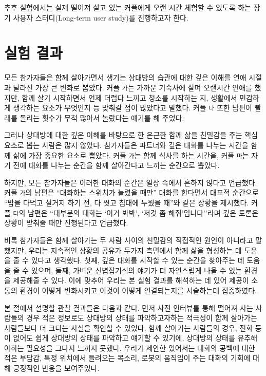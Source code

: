 추후 실험에서는 실제 떨어져 살고 있는 커플에게 \sysname\을 오랜 시간 체험할 수 있도록 하는 장기 사용자 스터디(Long-term user study)를 진행하고자 한다.


\section{실험 결과}


모든 참가자들은 함께 살아가면서 생기는 상대방의 습관에 대한 깊은 이해를 연애 시절과 달라진 가장 큰 변화로 뽑았다. 커플 \texttt{가}는 가까운 기숙사에 살며 오랜시간 연애를 했지만, 함께 살기 시작하면서 언제 더럽다 느끼고 청소를 시작하는 지, 생활에서 민감하게 생각하는 요소가 무엇인지 등 맞춰갈 점이 많았다고 말했다. 커플 \texttt{나} 또한 남편이 빨래를 돌리는 횟수가 무척 많아서 놀랐다는 얘기를 해 주었다.

그러나 상대방에 대한 깊은 이해를 바탕으로 한 은근한 함께 삶을 친밀감을 주는 핵심 요소로 뽑는 사람은 많지 않았다. 참가자들은 파트너와 깊은 대화를 나누는 시간을 함께 삶에 가장 중요한 요소로 뽑았다. 커플 \texttt{가}는 함께 식사를 하는 시간을, 커플 \texttt{마}는 자기 전에 대화를 나누는 순간을 함께 살아간다고 느끼는 순간으로 뽑았다.

하지만, 모든 참가자들은 이러한 대화의 순간은 일상 속에서 흔하지 않다고 언급했다. 커플 \texttt{가}의 남편은 ``대화하는 스위치가 눌렸을 때만'' 대화를 한다면서 대표적 순간으로 ``밥을 다먹고 설거지 하기 전, 다 씻고 침대에 누웠을 때''와 같은 상황을 제시했다. 커플 \texttt{다}의 남편은 ``대부분의 대화는 `이거 봐봐', `저것 좀 해줘'입니다''라며 깊은 토론은 상황이 받춰줄 때만 진행된다고 언급했다.

비록 참가자들은 \concept\가 함께 살아가는 두 사람 사이의 친밀감의 직접적인 원인이 아니라고 말했지만, 우리는 지속적인 상황의 공유가 두가지 측면에서 함께 삶을 형성하는 데 도움을 줄 수 있다고 생각했다. 첫째, 깊은 대화를 시작할 수 있는 순간을 찾아주는 데 도움을 줄 수 있으며, 둘째, 가벼운 신볍잡기식의 얘기가 더 자연스럽게 나올 수 있는 환경을 제공해줄 수 있다. 이에 맞추어 우리는 본 실험 결과를 해석하는 데 있어  제공이 소통의 환경이 어떻게 변화시키고 이것이  어떻게 연결되는지를 서술하는데 집중하였다.

본 절에서 설명할 관찰 결과들은 다음과 같다. 먼저 사전 인터뷰를 통해 떨어져 사는 사람들의 경우 적은 정보로도 상대방의 상태를 파악하고자하는 적극성이 함께 살아가는 사람들보다 더 크다는 사실을 확인할 수 있었다. 함께 살아가는 사람들의 경우, 전화 등이 없어도 쉽게 상대방의 상태를 파악하고 얘기할 수 있기에, 상대방의 상태를 유추해야하는 필요성을 그다지 느끼지 못했다. 우리가 제안한  있어서는 대화의 공백에 대한 적은 부담감, 특정 위치에서 들려오는 목소리, 로봇의 움직임이 주는 대화의 기회에 대해 긍정적인 반응을 보여주었다.


